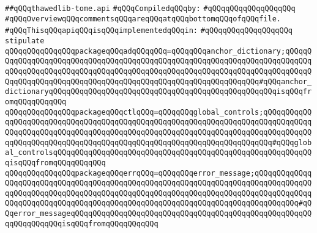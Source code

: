\label{src/app/makelib/compilable/thawedlib-tome.api}
\verb|##qQQqthawedlib-tome.api|\newline
\newline
\verb|#qQQqCompiledqQQqby:|\newline
\verb|#qQQqqQQqqQQqqQQqqQQq|\newline
\newline
\newline
\verb|#qQQqOverviewqQQqcommentsqQQqareqQQqatqQQqbottomqQQqofqQQqfile.|\newline
\newline
\verb|#qQQqThisqQQqapiqQQqisqQQqimplementedqQQqin:|\newline
\verb|#qQQqqQQqqQQqqQQqqQQq|\newline
\newline
\verb|stipulate|\newline
\verb|qQQqqQQqqQQqqQQqpackageqQQqadqQQqqQQq=qQQqqQQqanchor_dictionary;qQQqqQQqqQQqqQQqqQQqqQQqqQQqqQQqqQQqqQQqqQQqqQQqqQQqqQQqqQQqqQQqqQQqqQQqqQQqqQQqqQQqqQQqqQQqqQQqqQQqqQQqqQQqqQQqqQQqqQQqqQQqqQQqqQQqqQQqqQQqqQQqqQQqqQQqqQQqqQQqqQQqqQQqqQQqqQQqqQQqqQQqqQQqqQQqqQQqqQQqqQQq#qQQqanchor_dictionaryqQQqqQQqqQQqqQQqqQQqqQQqqQQqqQQqqQQqqQQqqQQqqQQqqQQqisqQQqfromqQQqqQQqqQQq|\newline
\verb|qQQqqQQqqQQqqQQqpackageqQQqctlqQQq=qQQqqQQqglobal_controls;qQQqqQQqqQQqqQQqqQQqqQQqqQQqqQQqqQQqqQQqqQQqqQQqqQQqqQQqqQQqqQQqqQQqqQQqqQQqqQQqqQQqqQQqqQQqqQQqqQQqqQQqqQQqqQQqqQQqqQQqqQQqqQQqqQQqqQQqqQQqqQQqqQQqqQQqqQQqqQQqqQQqqQQqqQQqqQQqqQQqqQQqqQQqqQQqqQQqqQQqqQQqqQQqqQQq#qQQqglobal_controlsqQQqqQQqqQQqqQQqqQQqqQQqqQQqqQQqqQQqqQQqqQQqqQQqqQQqqQQqqQQqisqQQqfromqQQqqQQqqQQq|\newline
\verb|qQQqqQQqqQQqqQQqpackageqQQqerrqQQq=qQQqqQQqerror_message;qQQqqQQqqQQqqQQqqQQqqQQqqQQqqQQqqQQqqQQqqQQqqQQqqQQqqQQqqQQqqQQqqQQqqQQqqQQqqQQqqQQqqQQqqQQqqQQqqQQqqQQqqQQqqQQqqQQqqQQqqQQqqQQqqQQqqQQqqQQqqQQqqQQqqQQqqQQqqQQqqQQqqQQqqQQqqQQqqQQqqQQqqQQqqQQqqQQqqQQqqQQqqQQqqQQqqQQqqQQq#qQQqerror_messageqQQqqQQqqQQqqQQqqQQqqQQqqQQqqQQqqQQqqQQqqQQqqQQqqQQqqQQqqQQqqQQqqQQqisqQQqfromqQQqqQQqqQQq|\newline
